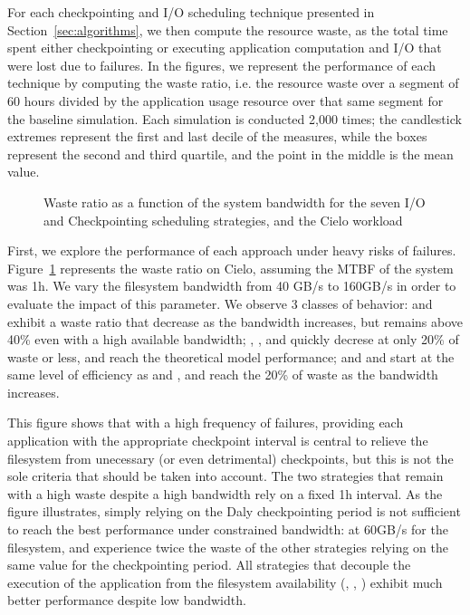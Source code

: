 For each checkpointing and I/O scheduling technique presented in
Section~\ref{sec:algorithms}, we then compute the resource waste, as
the total time spent either checkpointing or executing application computation and I/O that were lost due to failures. In the figures, we represent the
performance of each technique by computing the waste ratio, i.e. the
resource waste over a segment of 60 hours divided by the application
usage resource over that same segment for the baseline
simulation. Each simulation is conducted 2,000 times; the
candlestick extremes represent the first and last decile of the
measures, while the boxes represent the second and third quartile, and
the point in the middle is the mean value.

\begin{figure}
  \begin{center}
    \resizebox{\linewidth}{!}{}
  \end{center}
  \caption{Waste ratio as a function of the system bandwidth for the
    seven I/O and Checkpointing scheduling strategies, and the Cielo
    workload \label{fig:cielo-1hmtbf}}
\end{figure}

First, we explore the performance of each approach under heavy risks
of failures. Figure~\ref{fig:cielo-1hmtbf} represents the waste ratio
on Cielo, assuming the MTBF of the system was 1h. We vary the
filesystem bandwidth from 40 GB/s to 160GB/s in order to evaluate the
impact of this parameter. We observe 3 classes of behavior: \propfixed
and \bfifofixed exhibit a waste ratio that decrease as the bandwidth
increases, but remains above 40\% even with a high available
bandwidth; \fifodaly, \fifofixed, and \cooperative quickly decrese at
only 20\% of waste or less, and reach the theoretical model
performance; and \propdaly and \bfifodaly start at the same level of
efficiency as \propfixed and \bfifofixed, and reach the 20\% of waste
as the bandwidth increases.

This figure shows that with a high frequency of failures, providing
each application with the appropriate checkpoint interval is central
to relieve the filesystem from unecessary (or even detrimental)
checkpoints, but this is not the sole criteria that should be taken
into account. The two strategies that remain with a high waste despite
a high bandwidth rely on a fixed 1h interval. As the figure
illustrates, simply relying on the Daly checkpointing period is not
sufficient to reach the best performance under constrained bandwidth:
at 60GB/s for the filesystem, \propdaly and \bfifodaly experience
twice the waste of the other strategies relying on the same value for
the checkpointing period. All strategies that decouple the execution
of the application from the filesystem availability (\fifodaly,
\fifofixed, \cooperative) exhibit much better performance despite low
bandwidth.

